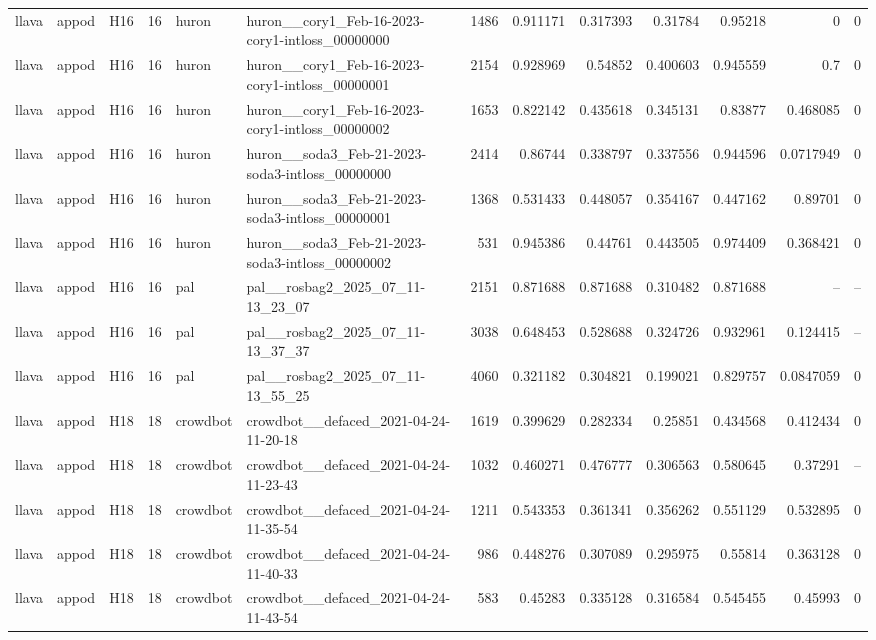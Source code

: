\begin{longtable}{lllrllrrrrrrr}
llava & appod & H16 & 16 & huron & huron\_\_cory1\_Feb-16-2023-cory1-intloss\_00000000 & 1486 & 0.911171 & 0.317393 & 0.31784 & 0.95218 & 0 & 0 \\
llava & appod & H16 & 16 & huron & huron\_\_cory1\_Feb-16-2023-cory1-intloss\_00000001 & 2154 & 0.928969 & 0.54852 & 0.400603 & 0.945559 & 0.7 & 0 \\
llava & appod & H16 & 16 & huron & huron\_\_cory1\_Feb-16-2023-cory1-intloss\_00000002 & 1653 & 0.822142 & 0.435618 & 0.345131 & 0.83877 & 0.468085 & 0 \\
llava & appod & H16 & 16 & huron & huron\_\_soda3\_Feb-21-2023-soda3-intloss\_00000000 & 2414 & 0.86744 & 0.338797 & 0.337556 & 0.944596 & 0.0717949 & 0 \\
llava & appod & H16 & 16 & huron & huron\_\_soda3\_Feb-21-2023-soda3-intloss\_00000001 & 1368 & 0.531433 & 0.448057 & 0.354167 & 0.447162 & 0.89701 & 0 \\
llava & appod & H16 & 16 & huron & huron\_\_soda3\_Feb-21-2023-soda3-intloss\_00000002 & 531 & 0.945386 & 0.44761 & 0.443505 & 0.974409 & 0.368421 & 0 \\
llava & appod & H16 & 16 & pal & pal\_\_rosbag2\_2025\_07\_11-13\_23\_07 & 2151 & 0.871688 & 0.871688 & 0.310482 & 0.871688 & -- & -- \\
llava & appod & H16 & 16 & pal & pal\_\_rosbag2\_2025\_07\_11-13\_37\_37 & 3038 & 0.648453 & 0.528688 & 0.324726 & 0.932961 & 0.124415 & -- \\
llava & appod & H16 & 16 & pal & pal\_\_rosbag2\_2025\_07\_11-13\_55\_25 & 4060 & 0.321182 & 0.304821 & 0.199021 & 0.829757 & 0.0847059 & 0 \\
llava & appod & H18 & 18 & crowdbot & crowdbot\_\_defaced\_2021-04-24-11-20-18 & 1619 & 0.399629 & 0.282334 & 0.25851 & 0.434568 & 0.412434 & 0 \\
llava & appod & H18 & 18 & crowdbot & crowdbot\_\_defaced\_2021-04-24-11-23-43 & 1032 & 0.460271 & 0.476777 & 0.306563 & 0.580645 & 0.37291 & -- \\
llava & appod & H18 & 18 & crowdbot & crowdbot\_\_defaced\_2021-04-24-11-35-54 & 1211 & 0.543353 & 0.361341 & 0.356262 & 0.551129 & 0.532895 & 0 \\
llava & appod & H18 & 18 & crowdbot & crowdbot\_\_defaced\_2021-04-24-11-40-33 & 986 & 0.448276 & 0.307089 & 0.295975 & 0.55814 & 0.363128 & 0 \\
llava & appod & H18 & 18 & crowdbot & crowdbot\_\_defaced\_2021-04-24-11-43-54 & 583 & 0.45283 & 0.335128 & 0.316584 & 0.545455 & 0.45993 & 0 \\

\end{longtable}
